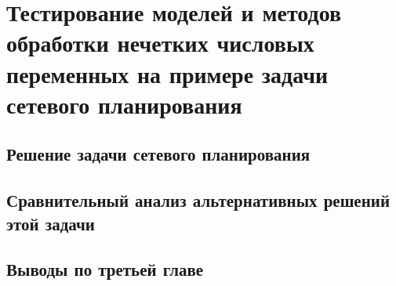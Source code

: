 \chapter{Тестирование моделей и методов обработки нечетких числовых переменных на примере задачи сетевого планирования}
\label{chapter3}

\section{Решение задачи сетевого планирования}
\label{chapter3_1}


\section{Сравнительный анализ альтернативных решений этой задачи} 
\label{chapter3_2}


\section*{Выводы по третьей главе} 
\label{chapter3_3}

